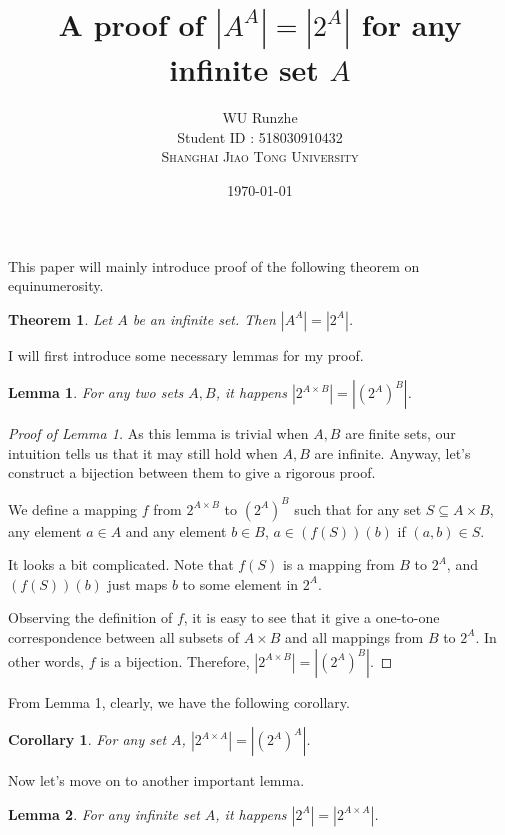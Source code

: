 \documentclass[12pt]{article}
\title{A proof of $|A^A|=|2^A|$ for any infinite set $A$}
\author{WU Runzhe\\
	Student ID : 518030910432\\
	\textsc{Shanghai Jiao Tong University}}
\date{\today}
\newtheorem{lemma}{Lemma}
\newtheorem{theorem}{Theorem}
\newtheorem{corollary}{Corollary}
\begin{document}
	\maketitle
	
	This paper will mainly introduce proof of the following theorem on equinumerosity.
	
	\begin{theorem}
		Let $A$ be an infinite set. Then $|A^A|=|2^A|$.
	\end{theorem}
	
	I will first introduce some necessary lemmas for my proof. 
	
	\begin{lemma}
		For any two sets $A, B$, it happens $|2^{A\times B}|=|(2^A)^B|$.
	\end{lemma}
	
	\begin{proof}[Proof of Lemma 1]
		As this lemma is trivial when $A,B$ are finite sets, our intuition tells us that it may still hold when $A,B$ are infinite. Anyway, let's construct a bijection between them to give a rigorous proof.
		
		We define a mapping $f$ from $2^{A\times B}$ to $(2^A)^B$ such that for any set $S\subseteq A\times B$, any element $a\in A$ and any element $b\in B$, $a\in(f(S))(b)$ if $(a,b)\in S$. 
		
		It looks a bit complicated. Note that $f(S)$ is a mapping from $B$ to $2^A$, and $(f(S))(b)$ just maps $b$ to some element in $2^A$.
		
		Observing the definition of $f$, it is easy to see that it give a one-to-one correspondence between all subsets of $A\times B$ and all mappings from $B$ to $2^A$. In other words, $f$ is a bijection. Therefore, $|2^{A\times B}|=|(2^A)^B|$.
		
	\end{proof}
	
	From Lemma 1, clearly, we have the following corollary.
	
	\begin{corollary}
		For any set $A$, $|2^{A\times A}|=|(2^A)^A|$.
	\end{corollary}
	
	Now let's move on to another important lemma.
	
	\begin{lemma}
		For any infinite set $A$, it happens $|2^A|=|2^{A\times A}|$.
	\end{lemma}
	
\end{document}
